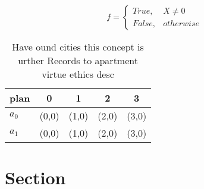 \documentclass[a4paper]{article}
\begin{document}
\begin{equation}   f =
\begin{cases} True, & X \neq 0\\
False, & otherwise
\end{cases}
\end{equation}

\begin{table}
\begin{adjustbox}{width=0.5\columnwidth}
\begin{tabular}{|l|l|l|l|l|}
\hline
\textbf{plan} & \multicolumn{1}{c|}{\textbf{0}} & \multicolumn{1}{c|}{\textbf{1}} & \multicolumn{1}{c|}{\textbf{2}} & \multicolumn{1}{c|}{\textbf{3}} \\ \hline
\textbf{$a_0$}  & (0,0) & (1,0) & (2,0) & (3,0) \\ \hline
\textbf{$a_1$}  & (0,0) & (1,0) & (2,0) & (3,0) \\ \hline
\end{tabular}
\end{adjustbox}
\caption{Have ound cities this concept is urther Records to apartment virtue ethics desc
}
\end{table}

\section{Section}
\end{document}
